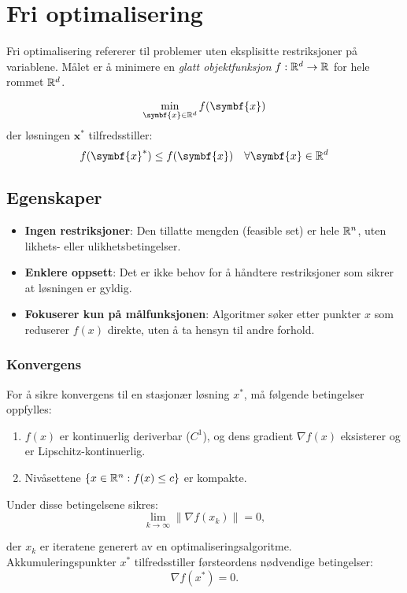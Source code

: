 \chapter{Fri optimalisering}

Fri optimalisering refererer til problemer uten eksplisitte restriksjoner på variablene.
Målet er å minimere en \textit{glatt objektfunksjon} \( f : \mathbb{R}^d \to \mathbb{R} \) for hele rommet \( \mathbb{R}^d \).

\[
  \min_{\symbf{x} \in \R^d} f(\symbf{x})
\]
der løsningen \( \symbf{x}^* \) tilfredsstiller:
\[
  f(\symbf{x}^*) \leq f(\symbf{x}) \quad \forall \symbf{x} \in \R^d
\]

\section{Egenskaper}

\begin{itemize}
  \item \textbf{Ingen restriksjoner}: Den tillatte mengden (feasible set) er hele \( \mathbb{R}^n \), uten likhets- eller ulikhetsbetingelser.
  \item \textbf{Enklere oppsett}: Det er ikke behov for å håndtere restriksjoner som sikrer at løsningen er gyldig.
  \item \textbf{Fokuserer kun på målfunksjonen}: Algoritmer søker etter punkter \( x \) som reduserer \( f(x) \) direkte, uten å ta hensyn til andre forhold.
\end{itemize}

\subsection*{Konvergens}
For å sikre konvergens til en stasjonær løsning \( x^* \), må følgende betingelser oppfylles:
\begin{enumerate}
  \item \( f(x) \) er kontinuerlig deriverbar (\( C^1 \)), og dens gradient \( \nabla f(x) \) eksisterer og er Lipschitz-kontinuerlig.
  \item Nivåsettene \( \{x \in \mathbb{R}^n : f(x) \leq c\} \) er kompakte.
\end{enumerate}

Under disse betingelsene sikres:
\[
  \lim_{k \to \infty} \|\nabla f(x_k)\| = 0,
\]

der \( x_k \) er iteratene generert av en optimaliseringsalgoritme. Akkumuleringspunkter \( x^* \) tilfredsstiller førsteordens nødvendige betingelser:
\[
  \nabla f(x^*) = 0.
\]

